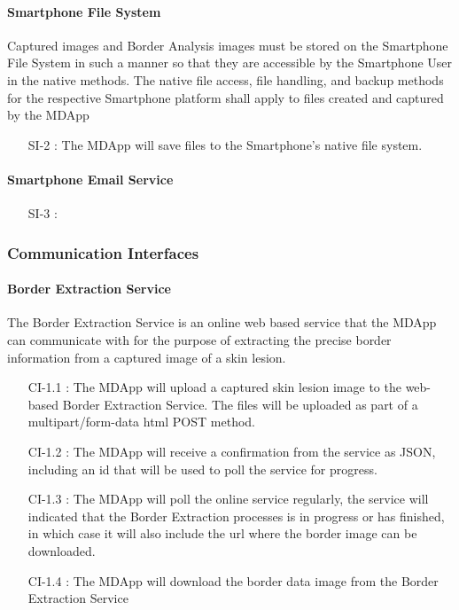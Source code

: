     \paragraph{Smartphone File System}

        Captured images and Border Analysis images must be stored on the Smartphone File System in such a manner so that they are accessible by the Smartphone User in the native methods. The native file access, file handling, and backup methods for the respective Smartphone platform shall apply to files created and captured by the MDApp

        \begin{itemize}[leftmargin=1.4cm]
            \item[SI-2 :] The MDApp will save files to the Smartphone's native file system.

        \end{itemize}

    \paragraph{Smartphone Email Service}

            \begin{itemize}[leftmargin=1.4cm]
            \item[SI-3 :] %

        \end{itemize}

\subsubsection{Communication Interfaces}

    \paragraph{Border Extraction Service }

        The Border Extraction Service is an online web based service that the MDApp can communicate with for the purpose of extracting the precise border information from a captured image of a skin lesion.

        \begin{itemize}[leftmargin=1.4cm]
            \item[CI-1.1 :] The MDApp will upload a captured skin lesion image to the web-based Border Extraction Service. The files will be uploaded as part of a multipart/form-data html POST method.
            \item[CI-1.2 :] The MDApp will receive a confirmation from the service as JSON, including an id that will be used to poll the service for progress.
            \item[CI-1.3 :] The MDApp will poll the online service regularly, the service will indicated that the Border Extraction processes is in progress or has finished, in which case it will also include the url where the border image can be downloaded.
            \item[CI-1.4 : ] The MDApp will download the border data image from the Border Extraction Service

        \end{itemize}

